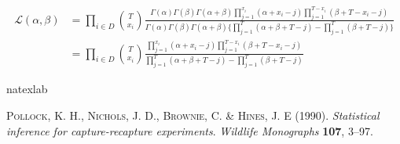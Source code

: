 \documentclass[manuscript]{biometrika}
\begin{document}
\begin{align} \label{eq:2}
    \mathcal{L}(\alpha, \beta) &= \prod_{i \in D} \binom{T}{x_i} \frac{\Gamma(\alpha)\Gamma(\beta)\Gamma(\alpha + \beta) \prod_{j=1}^{x_i} (\alpha + x_i - j)\prod_{j=1}^{T - x_i} (\beta + T - x_i - j)}{\Gamma(\alpha)\Gamma(\beta)\Gamma(\alpha + \beta)\{\prod_{j=1}^T(\alpha + \beta + T - j) - \prod_{j=1}^T (\beta + T - j)\}} \nonumber \\
    &= \prod_{i \in D} \binom{T}{x_i} \frac{\prod_{j=1}^{x_i} (\alpha + x_i - j)\prod_{j=1}^{T - x_i} (\beta + T - x_i - j)}{\prod_{j=1}^T(\alpha + \beta + T - j) - \prod_{j=1}^T (\beta + T - j)}
\end{align}
\begin{thebibliography}{1}
\expandafter\ifx\csname natexlab\endcsname\relax\def\natexlab#1{#1}\fi

\textsc{Pollock, K. H., Nichols, J. D., Brownie, C. \& Hines, J. E} (1990).
\newblock \textit{{Statistical inference for capture-recapture experiments}}.
\newblock \textit{Wildlife Monographs} \textbf{107}, 3--97.

\end{thebibliography}
\end{document}
